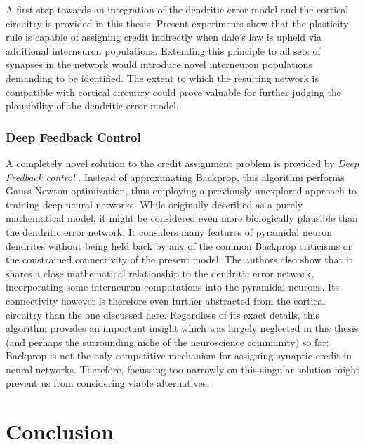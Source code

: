 A first step towards an integration of the dendritic error model and the cortical circuitry is provided in this thesis.
Present experiments show that the plasticity rule is capable of assigning credit indirectly when dale's law is upheld
via additional interneuron populations. Extending this principle to all sets of synapses in the network would introduce
novel interneuron populations demanding to be identified. The extent to which the resulting network is compatible with
cortical circuitry could prove valuable for further judging the plausibility of the dendritic error model.

\subsubsection*{Deep Feedback Control}

A completely novel solution to the credit assignment problem is provided by \textit{Deep Feedback control}
\citep{Meulemans2021,Meulemans2022}. Instead of approximating Backprop, this algorithm performs Gauss-Newton
optimization, thus employing a previously unexplored approach to training deep neural networks. While originally
described as a purely mathematical model, it might be considered even more biologically plausible than the dendritic
error network. It considers many features of pyramidal neuron dendrites without being held back by any of the common
Backprop criticisms or the constrained connectivity of the present model. The authors also show that it shares a close
mathematical relationship to the dendritic error network, incorporating some interneuron computations into the pyramidal
neurons. Its connectivity however is therefore even further abstracted from the cortical circuitry than the one
discussed here. Regardless of its exact details, this algorithm provides an important insight which was largely
neglected in this thesis (and perhaps the surrounding niche of the neuroscience community) so far: Backprop is not the
only competitive mechanism for assigning synaptic credit in neural networks. Therefore, focussing too narrowly on this
singular solution might prevent us from considering viable alternatives.



\section{Conclusion}

